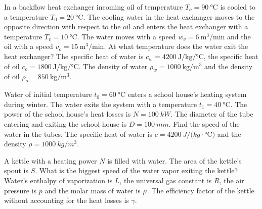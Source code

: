 \documentclass[11pt]{article}
\begin{document}
\probeng
In a backflow heat exchanger incoming oil of temperature $T_{o}=\SI{90}{\degreeCelsius}$ is cooled to a temperature $T_{0}=\SI{20}{\degreeCelsius}$. The cooling water in the heat exchanger moves to the opposite direction with respect to the oil and enters the heat exchanger with a temperature $T_{v}=\SI{10}{\degreeCelsius}$. The water moves with a speed $w_{v}=\SI{6}{\m^3\per\minute}$ and the oil with a speed $v_{o}=\SI{15}{\m^3\per\minute}$. At what temperature does the water exit the heat exchanger? The specific heat of water is $c_{w}=\SI{4200}{\joule\per\kilogram\per\degreeCelsius}$, the specific heat of oil $c_{o}=\SI{1800}{\joule\per\kilogram\per\degreeCelsius}$. The density of water $\rho_{w}=\SI{1000}{\kilogram\per\metre\cubed}$ and the density of oil $\rho_{o}=\SI{850}{\kilogram\per\metre\cubed}$.
\probend
\bigskip


\probeng
Water of initial temperature $t_0=\SI{60}{\degreeCelsius}$ enters a school house’s heating system during winter. The water exits the system with a temperature $t_1=\SI{40}{\degreeCelsius}$. The power of the school house’s heat losses is $N=\SI{100}{kW}$. The diameter of the tube entering and exiting the school house is $D=\SI{100}{mm}$. Find the speed of the water in the tubes. The specific heat of water is $c=\SI{4200}{J/(kg\cdot\degreeCelsius)}$ and the density $\rho=\SI{1000}{kg/m^3}$.
\probend
\bigskip


\probeng
A kettle with a heating power $N$ is filled with water. The area of the kettle’s spout is $S$. What is the biggest speed of the water vapor exiting the kettle? Water’s enthalpy of vaporization is $L$, the universal gas constant is $R$, the air pressure is $p$ and the molar mass of water is $\mu$. The efficiency factor of the kettle without accounting for the heat losses is $\gamma$.
\probend
\bigskip

\end{document}
